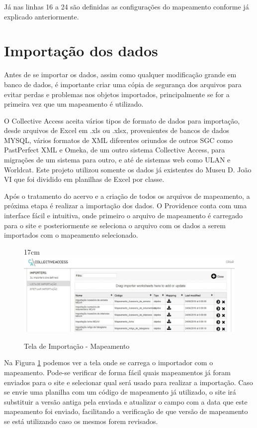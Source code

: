 \documentclass[a4paper,12pt,oneside,onecolumn,final,fleqn]{repUERJ}
\begin{document}
Já nas linhas 16 a 24 são definidas as configurações do mapeamento conforme já explicado anteriormente.

\section{Importação dos dados}

Antes de se importar os dados, assim como qualquer modificação grande em banco de dados, é importante criar uma cópia de segurança dos arquivos para evitar perdas e problemas nos objetos importados, principalmente se for a primeira vez que um mapeamento é utilizado.

O Collective Access aceita vários tipos de formato de dados para importação, desde arquivos de Excel em .xls ou .xlsx, provenientes de bancos de dados MYSQL, vários formatos de XML diferentes oriundos de outros SGC como PastPerfect XML e Omeka, de um outro sistema Collective Access, para migrações de um sistema para outro, e até de sistemas web como ULAN e Worldcat. Este projeto utilizou somente os dados já existentes do Museu D. João VI que foi dividido em planilhas de Excel por classe.

Após o tratamento do acervo e a criação de todos os arquivos de mapeamento, a próxima etapa é realizar a importação dos dados. O Providence conta com uma interface fácil e intuitiva, onde primeiro o arquivo de mapeamento é carregado para o site e posteriormente se seleciona o arquivo com os dados a serem importados com o mapeamento selecionado.

\begin{figure}[!ht]{17cm}
	\includegraphics[width=15cm, left]{figuras/tela_map.jpg}
	\caption{Tela de Importação - Mapeamento} \label{fig:mapeamento}
\end{figure}

Na Figura \ref{fig:mapeamento} podemos ver a tela onde se carrega o importador com o mapeamento. Pode-se verificar de forma fácil quais mapeamentos já foram enviados para o site e selecionar qual será usado para realizar a importação. Caso se envie uma planilha com um código de mapeamento já utilizado, o site irá substituir a versão antiga pela enviada e atualizar o campo com a data que este mapeamento foi enviado, facilitando a verificação de que versão de mapeamento se está utilizando caso os mesmos forem revisados.
\end{document}
